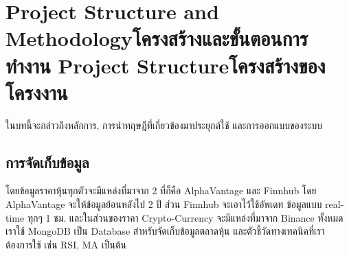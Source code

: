 \chapter{\ifproject%
\ifenglish Project Structure and Methodology\else โครงสร้างและขั้นตอนการทำงาน\fi
\else%
\ifenglish Project Structure\else โครงสร้างของโครงงาน\fi
\fi
}

ในบทนี้จะกล่าวถึงหลักการ, การนำทฤษฎีที่เกี่ยวข้องมาประยุกต์ใช้ และการออกแบบของระบบ

\makeatletter


\makeatother

\section{การจัดเก็บข้อมูล}
โดยข้อมูลราคาหุ้นทุกตัวจะมีแหล่งที่มาจาก 2 ที่ก็คือ AlphaVantage และ Finnhub โดย AlphaVantage จะให้ข้อมูลย้อนหลังไป 2 ปี ส่วน Finnhub จะเอาไว้ใช้อัพเดท
ข้อมูลแบบ real-time ทุกๆ 1 ชม. และในส่วนของราคา Crypto-Currency จะมีแหล่งที่มาจาก Binance ทั้งหมด
เราใช้ MongoDB เป็น Database สำหรับจัดเก็บข้อมูลตลาดหุ้น และตัวชี้วัดทางเทคนิคที่เราต้องการใช้ เช่น RSI, MA เป็นต้น

